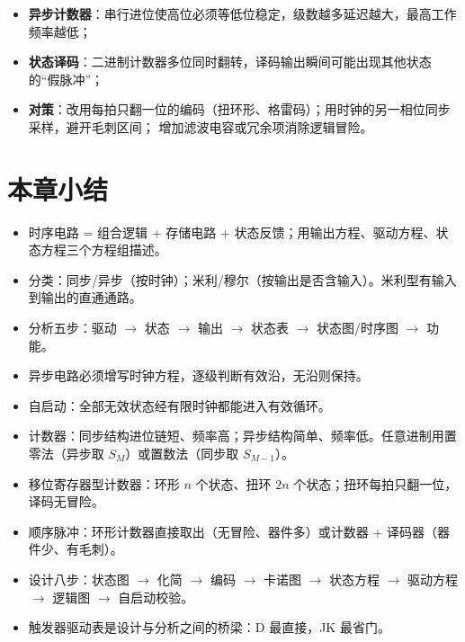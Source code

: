 \begin{itemize}
    \item \textbf{异步计数器}：串行进位使高位必须等低位稳定，级数越多延迟越大，最高工作频率越低；
    \item \textbf{状态译码}：二进制计数器多位同时翻转，译码输出瞬间可能出现其他状态的“假脉冲”；
    \item \textbf{对策}：改用每拍只翻一位的编码（扭环形、格雷码）；用时钟的另一相位同步采样，避开毛刺区间；
    增加滤波电容或冗余项消除逻辑冒险。
\end{itemize}

\section{本章小结}
\begin{itemize}
    \item 时序电路 = 组合逻辑 + 存储电路 + 状态反馈；用输出方程、驱动方程、状态方程三个方程组描述。
    \item 分类：同步/异步（按时钟）；米利/穆尔（按输出是否含输入）。米利型有输入到输出的直通通路。
    \item 分析五步：驱动 $\rightarrow$ 状态 $\rightarrow$ 输出 $\rightarrow$ 状态表 $\rightarrow$ 状态图/时序图 $\rightarrow$ 功能。
    \item 异步电路必须增写时钟方程，逐级判断有效沿，无沿则保持。
    \item 自启动：全部无效状态经有限时钟都能进入有效循环。
    \item 计数器：同步结构进位链短、频率高；异步结构简单、频率低。任意进制用置零法（异步取 $S_M$）或置数法（同步取 $S_{M-1}$）。
    \item 移位寄存器型计数器：环形 $n$ 个状态、扭环 $2n$ 个状态；扭环每拍只翻一位，译码无冒险。
    \item 顺序脉冲：环形计数器直接取出（无冒险、器件多）或计数器 + 译码器（器件少、有毛刺）。
    \item 设计八步：状态图 $\rightarrow$ 化简 $\rightarrow$ 编码 $\rightarrow$ 卡诺图 $\rightarrow$ 状态方程 $\rightarrow$ 驱动方程 $\rightarrow$ 逻辑图 $\rightarrow$ 自启动校验。
    \item 触发器驱动表是设计与分析之间的桥梁：D 最直接，JK 最省门。
\end{itemize}
